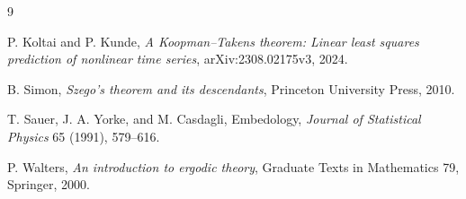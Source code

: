 \documentclass[11pt]{amsart}
\theoremstyle{remark}
\begin{document}
\begin{thebibliography}{9}

P. Koltai and P. Kunde,
\emph{A Koopman--Takens theorem: Linear least squares prediction of nonlinear
time series}, arXiv:2308.02175v3, 2024.

B. Simon,
\emph{Szego's theorem and its descendants},
Princeton University Press, 2010.

T. Sauer, J. A. Yorke, and M. Casdagli,
Embedology,
\emph{Journal of Statistical Physics} 65 (1991), 579--616.

P. Walters,
\emph{An introduction to ergodic theory},
Graduate Texts in Mathematics 79, Springer, 2000.

\end{thebibliography}
\end{document}
